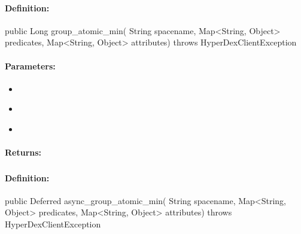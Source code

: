 \paragraph{Definition:}
\begin{javacode}
public Long group_atomic_min(
        String spacename,
        Map<String, Object> predicates,
        Map<String, Object> attributes) throws HyperDexClientException
\end{javacode}

\paragraph{Parameters:}
\begin{itemize}[noitemsep]
\item {}\\

\item {}\\

\item {}\\

\end{itemize}

\paragraph{Returns:}


\pagebreak
\subsubsection{}
\label{api:java:async_group_atomic_min}


\paragraph{Definition:}
\begin{javacode}
public Deferred async_group_atomic_min(
        String spacename,
        Map<String, Object> predicates,
        Map<String, Object> attributes) throws HyperDexClientException
\end{javacode}

